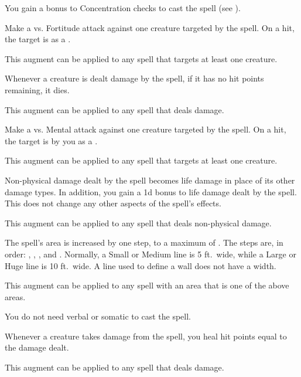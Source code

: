         {
             You gain a  bonus to Concentration checks to cast the spell (see ).

             Make a  vs. Fortitude attack against one creature targeted by the spell.
            On a hit, the target is  as a .
            \par This augment can be applied to any spell that targets at least one creature.

             Whenever a creature is dealt damage by the spell, if it has no hit points remaining, it dies.
            \par This augment can be applied to any spell that deals damage.

             Make a  vs. Mental attack against one creature targeted by the spell.
            On a hit, the target is  by you as a .
            \par This augment can be applied to any spell that targets at least one creature.

             Non-physical damage dealt by the spell becomes life damage in place of its other damage types.
            In addition, you gain a \plus1d bonus to life damage dealt by the spell.
            This does not change any other aspects of the spell's effects.
            \par This augment can be applied to any spell that deals non-physical damage.

             The spell's area is increased by one step, to a maximum of \areahuge.
            The steps are, in order: \areasmall, \areamed, \arealarge, and \areahuge.
            Normally, a Small or Medium line is 5 ft.\ wide, while a Large or Huge line is 10 ft.\ wide.
            A line used to define a wall does not have a width.
            \par This augment can be applied to any spell with an area that is one of the above areas.

             You do not need verbal or somatic  to cast the spell.

             Whenever a creature takes damage from the spell, you heal hit points equal to the damage dealt.
            \par This augment can be applied to any spell that deals damage.

}
